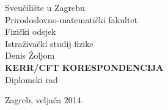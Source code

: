 



\def \ImeIPrezime {(Ime i prezime)}
\def \NASLOV {(NASLOV DIPLOMSKOG RADA)}
\def \VODITELJ {(ime profesora)}
\def \SMJER {(SMJER)}


\def \ImeIPrezime {Denis Žoljom}
\def \NASLOV {KERR/CFT KORESPONDENCIJA}

\def \VODITELJ {doc. dr. sc. Maro Cvitan}
\def \SMJER {ISTRAŽIVAČKI STUDIJ FIZIKE}


\begin{titlepage}
\thispagestyle{empty}
\pagestyle{empty} 
\begin{center}
{\Large \textsf{Sveučilište u Zagrebu}}\\[3mm]
{\Large \textsf{Prirodoslovno-matematički fakultet}}\\[4mm]
{\Large \textsf{Fizički odsjek}}\\[8mm]
{\Large \textsf{Istraživački studij fizike}}\\[10mm]
{\LARGE \textsf{Denis Žoljom}}\\[15mm]
{\LARGE \textbf{\textbf{\NASLOV}}}\\[10mm]
{\Large \textsf{Diplomski rad}}\\[30mm]
\null \hfill

\vfill
{\Large \textsf{Zagreb, veljača 2014.}}
\end{center}
\end{titlepage}

\thispagestyle{empty}
\pagestyle{empty} 


